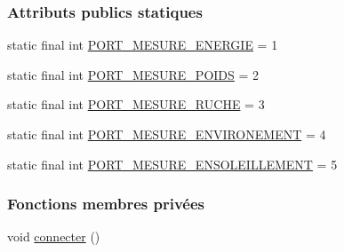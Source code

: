 \subsubsection*{Attributs publics statiques}
\begin{DoxyCompactItemize}
\item 
static final int \hyperlink{classfr_1_1campus_1_1laurainc_1_1honeybee_1_1_client_m_q_t_t_a423539a05c306ae52e5b6dc6fa6addc8}{P\+O\+R\+T\+\_\+\+M\+E\+S\+U\+R\+E\+\_\+\+E\+N\+E\+R\+G\+IE} = 1
\item 
static final int \hyperlink{classfr_1_1campus_1_1laurainc_1_1honeybee_1_1_client_m_q_t_t_a3630b0b9b902fee6796995399bee1a6a}{P\+O\+R\+T\+\_\+\+M\+E\+S\+U\+R\+E\+\_\+\+P\+O\+I\+DS} = 2
\item 
static final int \hyperlink{classfr_1_1campus_1_1laurainc_1_1honeybee_1_1_client_m_q_t_t_a3f264a8d2f3c294241bbe5557aa66770}{P\+O\+R\+T\+\_\+\+M\+E\+S\+U\+R\+E\+\_\+\+R\+U\+C\+HE} = 3
\item 
static final int \hyperlink{classfr_1_1campus_1_1laurainc_1_1honeybee_1_1_client_m_q_t_t_a85b9107442e2f5ef6fd6bef732336d8e}{P\+O\+R\+T\+\_\+\+M\+E\+S\+U\+R\+E\+\_\+\+E\+N\+V\+I\+R\+O\+N\+E\+M\+E\+NT} = 4
\item 
static final int \hyperlink{classfr_1_1campus_1_1laurainc_1_1honeybee_1_1_client_m_q_t_t_a49b4a61b3c65f6b3a1786ef6eeeb15e2}{P\+O\+R\+T\+\_\+\+M\+E\+S\+U\+R\+E\+\_\+\+E\+N\+S\+O\+L\+E\+I\+L\+L\+E\+M\+E\+NT} = 5
\end{DoxyCompactItemize}
\subsubsection*{Fonctions membres privées}
\begin{DoxyCompactItemize}
\item 
void \hyperlink{classfr_1_1campus_1_1laurainc_1_1honeybee_1_1_client_m_q_t_t_ab514adf6ebb879734ee8f2b3b2fd106a}{connecter} ()
\end{DoxyCompactItemize}
